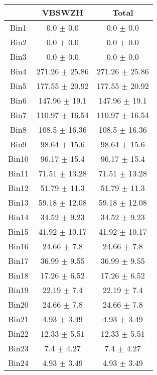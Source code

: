   \begin{tabular}{|c|c|c|}
  \hline
      & VBSWZH & Total \\ \cline{1-3} 
     \hline\hline
     Bin1 & 0.0 $\pm$ 0.0 & 0.0 $\pm$ 0.0 \\ \cline{1-3} 
     Bin2 & 0.0 $\pm$ 0.0 & 0.0 $\pm$ 0.0 \\ \cline{1-3} 
     Bin3 & 0.0 $\pm$ 0.0 & 0.0 $\pm$ 0.0 \\ \cline{1-3} 
     Bin4 & 271.26 $\pm$ 25.86 & 271.26 $\pm$ 25.86 \\ \cline{1-3} 
     Bin5 & 177.55 $\pm$ 20.92 & 177.55 $\pm$ 20.92 \\ \cline{1-3} 
     Bin6 & 147.96 $\pm$ 19.1 & 147.96 $\pm$ 19.1 \\ \cline{1-3} 
     Bin7 & 110.97 $\pm$ 16.54 & 110.97 $\pm$ 16.54 \\ \cline{1-3} 
     Bin8 & 108.5 $\pm$ 16.36 & 108.5 $\pm$ 16.36 \\ \cline{1-3} 
     Bin9 & 98.64 $\pm$ 15.6 & 98.64 $\pm$ 15.6 \\ \cline{1-3} 
     Bin10 & 96.17 $\pm$ 15.4 & 96.17 $\pm$ 15.4 \\ \cline{1-3} 
     Bin11 & 71.51 $\pm$ 13.28 & 71.51 $\pm$ 13.28 \\ \cline{1-3} 
     Bin12 & 51.79 $\pm$ 11.3 & 51.79 $\pm$ 11.3 \\ \cline{1-3} 
     Bin13 & 59.18 $\pm$ 12.08 & 59.18 $\pm$ 12.08 \\ \cline{1-3} 
     Bin14 & 34.52 $\pm$ 9.23 & 34.52 $\pm$ 9.23 \\ \cline{1-3} 
     Bin15 & 41.92 $\pm$ 10.17 & 41.92 $\pm$ 10.17 \\ \cline{1-3} 
     Bin16 & 24.66 $\pm$ 7.8 & 24.66 $\pm$ 7.8 \\ \cline{1-3} 
     Bin17 & 36.99 $\pm$ 9.55 & 36.99 $\pm$ 9.55 \\ \cline{1-3} 
     Bin18 & 17.26 $\pm$ 6.52 & 17.26 $\pm$ 6.52 \\ \cline{1-3} 
     Bin19 & 22.19 $\pm$ 7.4 & 22.19 $\pm$ 7.4 \\ \cline{1-3} 
     Bin20 & 24.66 $\pm$ 7.8 & 24.66 $\pm$ 7.8 \\ \cline{1-3} 
     Bin21 & 4.93 $\pm$ 3.49 & 4.93 $\pm$ 3.49 \\ \cline{1-3} 
     Bin22 & 12.33 $\pm$ 5.51 & 12.33 $\pm$ 5.51 \\ \cline{1-3} 
     Bin23 & 7.4 $\pm$ 4.27 & 7.4 $\pm$ 4.27 \\ \cline{1-3} 
     Bin24 & 4.93 $\pm$ 3.49 & 4.93 $\pm$ 3.49 \\ \cline{1-3} 

\end{tabular}
